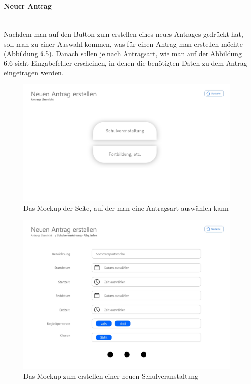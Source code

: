 \paragraph{Neuer Antrag}
~\\
Nachdem man auf den Button zum erstellen eines neues Antrages gedrückt hat, soll man zu einer Auswahl kommen, was für einen Antrag man erstellen möchte (Abbildung 6.5). Danach sollen je nach Antragsart, wie man auf der Abbildung 6.6 sieht Eingabefelder erscheinen, in denen die benötigten Daten zu dem Antrag eingetragen werden.
\begin{figure}[H]
	\centering
	\includegraphics[width=1\linewidth]{images/Mockup-Neuer-Antrag}
	\caption[Mockup neuer Antrag]{Das Mockup der Seite, auf der man eine Antragsart auswählen kann}
	\label{fig:mockupNeu}
\end{figure}
\begin{figure}[H]
	\centering
	\includegraphics[width=1\linewidth]{images/Mockup-Antrag-erstellen}
	\caption[Mockup Antrag erstellen]{Das Mockup zum erstellen einer neuen Schulveranstaltung}
	\label{fig:mockupErstellen}
\end{figure}
